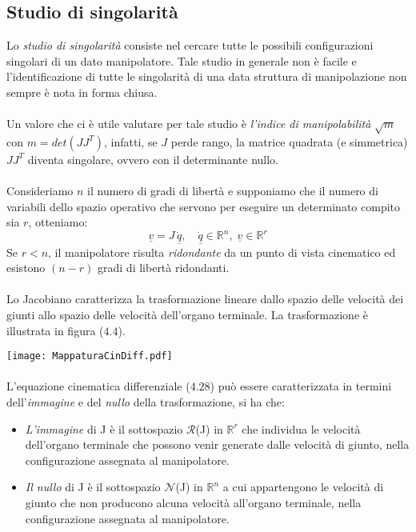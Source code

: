 \subsection{Studio di singolarità}
Lo \emph{studio di singolarità} consiste nel cercare tutte le possibili configurazioni singolari di un dato manipolatore. Tale studio in generale non è facile e l'identificazione di tutte le singolarità di una data struttura di manipolazione non sempre è nota in forma chiusa. 
\paragraph{}
Un valore che ci è utile valutare per tale studio è \emph{l'indice di manipolabilità} $\sqrt{m}$ con $m = det(JJ^T)$, infatti, se $J$ perde rango, la matrice quadrata (e simmetrica) $JJ^T$ diventa singolare, ovvero con il determinante nullo.
\paragraph{}
Consideriamo $n$ il numero di gradi di libertà e supponiamo che il numero di variabili dello spazio operativo che servono per eseguire un determinato compito sia $r$, otteniamo:
\begin{equation}
	\underline{v} = J\,\underline{\dot{q}}, \quad \underline{\dot{q}}\in\mathbb{R}^n, \; \underline{v}\in\mathbb{R}^r
\end{equation}
Se $r<n$, il manipolatore risulta \emph{ridondante} da un punto di vista cinematico ed esistono $(n-r)$ gradi di libertà ridondanti. 

\paragraph{}
Lo Jacobiano caratterizza la trasformazione lineare dallo spazio delle velocità dei giunti allo spazio delle velocità dell'organo terminale. La trasformazione è illustrata in figura ($4.4$).
\begin{center}
\texttt{[image: MappaturaCinDiff.pdf]}
\end{center}
\paragraph{}
L'equazione cinematica differenziale ($4.28$) può essere caratterizzata in termini dell'\emph{immagine} e del \emph{nullo} della trasformazione, si ha che:
\begin{itemize}
	\item \emph{L'immagine} di J è il sottospazio $\mathcal{R}$(J) in $\mathbb{R}^r$ che individua le velocità dell'organo terminale che possono venir generate dalle velocità di giunto, nella configurazione assegnata al manipolatore.
	\item \emph{Il nullo} di J è il sottospazio $\mathcal{N}$(J) in $\mathbb{R}^n$ a cui appartengono le velocità di giunto che non producono alcuna velocità all'organo terminale, nella configurazione assegnata al manipolatore.
\end{itemize} 

